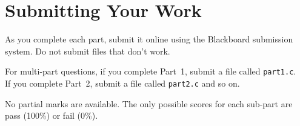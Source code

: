 \section*{Submitting Your Work}
As you complete each part, submit it online using the Blackboard
submission system. Do not submit files that don't work.

For multi-part questions, if you complete Part~1, submit a file called \verb^part1.c^.\\
If you complete Part~2, submit a file called \verb^part2.c^ and so on.

No partial marks are available.
The only possible scores for each sub-part are pass (100\%) or fail (0\%).
